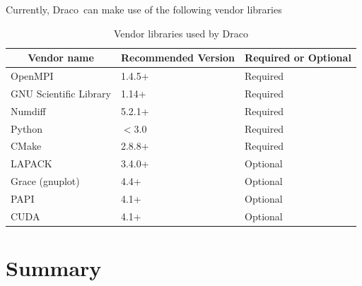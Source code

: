 \documentclass[note]{ResearchNote_pdf}
\newcommand{\draco}{{\normalfont\small\sffamily Draco}}
\begin{document}
Currently, \draco\ can make use of the following vendor libraries
%
\begin{table}[ht]
  \caption{Vendor libraries used by \draco}
  \label{tab:vendors}
\begin{center}
\begin{tabular}{lll} \hline\hline
\multicolumn{1}{c}{Vendor name} & 
\multicolumn{1}{c}{Recommended Version} & 
\multicolumn{1}{c}{Required or Optional} \\ \hline
OpenMPI                & 1.4.5+ & Required \\
GNU Scientific Library & 1.14+  & Required \\
Numdiff                & 5.2.1+ & Required \\
Python                 & $<$3.0 & Required \\
CMake                  & 2.8.8+ & Required \\
LAPACK                 & 3.4.0+ & Optional \\
Grace (gnuplot)        & 4.4+   & Optional \\
PAPI                   & 4.1+   & Optional \\
CUDA & 4.1+ & Optional \\
\hline\hline
\end{tabular}
\end{center}
\end{table}





\section{Summary}
\label{sec:summary}
\end{document}
